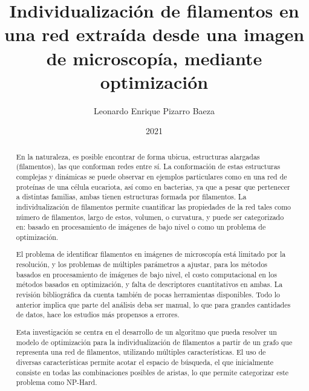 \documentclass[upright, contnum]{umemoria}
\author{Leonardo Enrique Pizarro Baeza}
\title{Individualizaci\'on de filamentos en una red extra\'ida desde una imagen de microscop\'ia, mediante optimizaci\'on}
\date{2021}
\begin{document}
\newcommand{\citepxl}[2][]{(#1\unskip \citet{#2})}

\frontmatter
\maketitle

\begin{abstract}
En la naturaleza, es posible encontrar de forma ubicua, estructuras alargadas (filamentos), las que conforman redes entre s\'i.  La conformaci\'on de estas estructuras complejas y din\'amicas se puede observar en ejemplos
particulares como en una red de prote\'inas de una c\'elula eucariota, as\'i como en bacterias, ya que a pesar que pertenecer a distintas familias, ambas tienen estructuras formada por filamentos. La individualizaci\'on de filamentos permite cuantificar las propiedades de la red tales como n\'umero de filamentos, largo de estos, volumen, o curvatura, y  puede ser categorizado en: basado en procesamiento de im\'agenes de bajo nivel o como un problema de optimizaci\'on.

El problema de identificar filamentos en im\'agenes de microscop\'ia est\'a limitado por la resoluci\'on, y los problemas de m\'ultiples par\'ametros a ajustar, para los m\'etodos basados en procesamiento de im\'agenes de bajo nivel, el costo
computacional en los m\'etodos basados en optimizaci\'on, y falta de descriptores cuantitativos en ambas. La revisi\'on bibliogr\'afica da cuenta tambi\'en de pocas herramientas disponibles. Todo lo anterior implica que parte del an\'alisis deba ser manual, lo que para grandes cantidades de datos, hace los estudios más propensos a errores.

Esta investigación se centra en el desarrollo de un algoritmo que pueda resolver un modelo de optimizaci\'on para la individualizaci\'on de filamentos a partir de un grafo que representa una red de filamentos, utilizando m\'ultiples caracter\'isticas. El uso de diversas caracter\'isticas permite acotar el espacio de b\'usqueda, el que inicialmente consiste en todas las combinaciones posibles de aristas, lo que permite categorizar este problema como NP-Hard.




\end{abstract}
\end{document}
